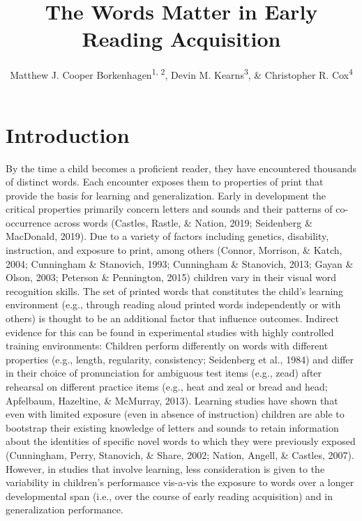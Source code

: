 \documentclass[
  ,man,floatsintext]{apa6}
\title{The Words Matter in Early Reading Acquisition}
\author{Matthew J. Cooper Borkenhagen\textsuperscript{1, 2}, Devin M. Kearns\textsuperscript{3}, \& Christopher R. Cox\textsuperscript{4}}
\date{}
\affiliation{\vspace{0.5cm}\textsuperscript{1} Florida State University\\\textsuperscript{2} The Florida Center for Reading Research\\\textsuperscript{3} North Carolina State University\\\textsuperscript{4} Louisiana State University}
\begin{document}
\maketitle

\hypertarget{introduction}{%
\section{Introduction}\label{introduction}}

By the time a child becomes a proficient reader, they have encountered thousands of distinct words. Each encounter exposes them to properties of print that provide the basis for learning and generalization. Early in development the critical properties primarily concern letters and sounds and their patterns of co-occurrence across words (Castles, Rastle, \& Nation, 2019; Seidenberg \& MacDonald, 2019). Due to a variety of factors including genetics, disability, instruction, and exposure to print, among others (Connor, Morrison, \& Katch, 2004; Cunningham \& Stanovich, 1993; Cunningham \& Stanovich, 2013; Gayan \& Olson, 2003; Peterson \& Pennington, 2015) children vary in their visual word recognition skills. The set of printed words that constitutes the child's learning environment (e.g., through reading aloud printed words independently or with others) is thought to be an additional factor that influence outcomes. Indirect evidence for this can be found in experimental studies with highly controlled training environments: Children perform differently on words with different properties (e.g., length, regularity, consistency; Seidenberg et al., 1984) and differ in their choice of pronunciation for ambiguous test items (e.g., zead) after rehearsal on different practice items (e.g., heat and zeal or bread and head; Apfelbaum, Hazeltine, \& McMurray, 2013). Learning studies have shown that even with limited exposure (even in absence of instruction) children are able to bootstrap their existing knowledge of letters and sounds to retain information about the identities of specific novel words to which they were previously exposed (Cunningham, Perry, Stanovich, \& Share, 2002; Nation, Angell, \& Castles, 2007). However, in studies that involve learning, less consideration is given to the variability in children's performance vis-a-vis the exposure to words over a longer developmental span (i.e., over the course of early reading acquisition) and in generalization performance.
\end{document}
